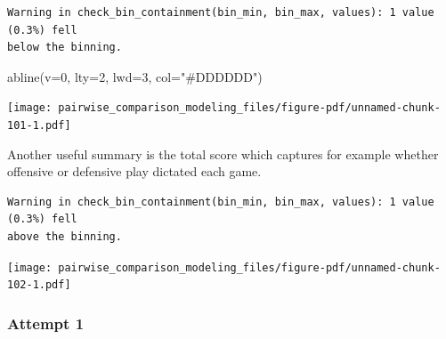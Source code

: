 \documentclass[
  letterpaper,
  DIV=11,
  numbers=noendperiod]{scrartcl}
\newenvironment{Shaded}{\begin{snugshade}}{\end{snugshade}}
\newcommand{\AttributeTok}[1]{\textcolor[rgb]{0.40,0.45,0.13}{#1}}
\newcommand{\DecValTok}[1]{\textcolor[rgb]{0.68,0.00,0.00}{#1}}
\newcommand{\FunctionTok}[1]{\textcolor[rgb]{0.28,0.35,0.67}{#1}}
\newcommand{\NormalTok}[1]{\textcolor[rgb]{0.00,0.23,0.31}{#1}}
\newcommand{\SpecialCharTok}[1]{\textcolor[rgb]{0.37,0.37,0.37}{#1}}
\newcommand{\StringTok}[1]{\textcolor[rgb]{0.13,0.47,0.30}{#1}}
\begin{document}
\begin{verbatim}
Warning in check_bin_containment(bin_min, bin_max, values): 1 value (0.3%) fell
below the binning.
\end{verbatim}

\begin{Shaded}
\begin{Highlighting}[]
\FunctionTok{abline}\NormalTok{(}\AttributeTok{v=}\DecValTok{0}\NormalTok{, }\AttributeTok{lty=}\DecValTok{2}\NormalTok{, }\AttributeTok{lwd=}\DecValTok{3}\NormalTok{, }\AttributeTok{col=}\StringTok{"\#DDDDDD"}\NormalTok{)}
\end{Highlighting}
\end{Shaded}

\texttt{[image: pairwise\_comparison\_modeling\_files/figure-pdf/unnamed-chunk-101-1.pdf]}

Another useful summary is the total score which captures for example
whether offensive or defensive play dictated each game.

\begin{Shaded}
\end{Shaded}

\begin{verbatim}
Warning in check_bin_containment(bin_min, bin_max, values): 1 value (0.3%) fell
above the binning.
\end{verbatim}

\texttt{[image: pairwise\_comparison\_modeling\_files/figure-pdf/unnamed-chunk-102-1.pdf]}

\subsubsection{Attempt 1}\label{attempt-1-2}
\end{document}
